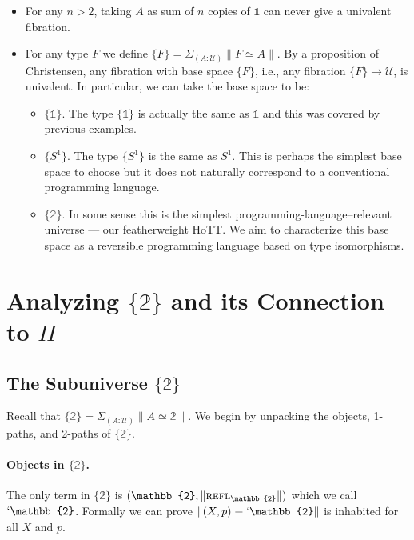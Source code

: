 \documentclass{entcs}
\newcommand{\reflp}{\textsc{refl}}
\newcommand{\ot}{\mathbb{1}}
\newcommand{\bt}{\mathbb{2}}
\begin{document}
\begin{itemize}
\item For any $n > 2$, taking $A$ as sum of $n$ copies of $\ot$ can never
  give a univalent fibration.

\item For any type $F$ we define
  $\{F\} = \Sigma_{(A : \mathcal{U})} \| F \simeq A \|$. By a proposition of
  Christensen, any fibration with base space $\{F\}$, i.e., any fibration
  $\{F\} \to \mathcal{U}$, is univalent. In particular, we can take the base
  space to be:
  \begin{itemize}
  \item $\{\ot\}$. The type $\{\ot\}$ is actually the same as $\ot$ and this was
    covered by previous examples.
  \item $\{S^1\}$. The type $\{S^1\}$ is the same as $S^1$. This is perhaps the
    simplest base space to choose but it does not naturally correspond to a
    conventional programming language.
  \item $\{\bt\}$. In some sense this is the simplest
    programming-language--relevant universe --- our featherweight HoTT. We aim
    to characterize this base space as a reversible programming language based
    on type isomorphisms.
  \end{itemize}

\end{itemize}

\section{Analyzing $\{\bt\}$ and its Connection to $\Pi$}

\subsection{The Subuniverse $\{\bt\}$}

Recall that $\{\bt\} = \Sigma_{(A:\mathcal{U})} \|A \simeq \bt\|$. We begin by
unpacking the objects, 1-paths, and 2-paths of $\{\bt\}$.

\paragraph*{Objects in $\{\bt\}$.} The only term in $\{\bt\}$ is
$(\bt,\|\reflp_{\bt}\|)$ which we call $`\bt$. Formally we can prove
$\|(X,p) \equiv `\bt\|$ is inhabited for all $X$ and $p$.
\end{document}
